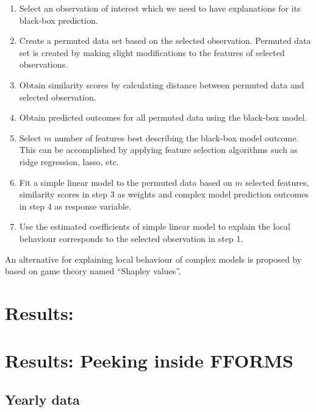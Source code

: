 \documentclass[11pt,a4paper,]{article}
\providecommand{\tightlist}{%
  \setlength{\itemsep}{0pt}\setlength{\parskip}{0pt}}
\begin{document}
\begin{enumerate}
\def\labelenumi{\arabic{enumi}.}
\tightlist
\item
  Select an observation of interest which we need to have explanations
  for its black-box prediction.
\item
  Create a permuted data set based on the selected observation. Permuted
  data set is created by making slight modifications to the features of
  selected observations.
\item
  Obtain similarity scores by calculating distance between permuted data
  and selected observation.
\item
  Obtain predicted outcomes for all permuted data using the black-box
  model.
\item
  Select \(m\) number of features best describing the black-box model
  outcome. This can be accomplished by applying feature selection
  algorithms such as ridge regression, lasso, etc.
\item
  Fit a simple linear model to the permuted data based on \(m\) selected
  features, similarity scores in step 3 as weights and complex model
  prediction outcomes in step 4 as response variable.
\item
  Use the estimated coefficients of simple linear model to explain the
  local behaviour corresponds to the selected observation in step 1.
\end{enumerate}

An alternative for explaining local behaviour of complex models is
proposed by \textcite{lundberg2017unified} based on game theory named
``Shapley values''.

\section{Results:}\label{results}

\section{Results: Peeking inside FFORMS}\label{results2}

\subsection{Yearly data}\label{yearly-data}
\end{document}
